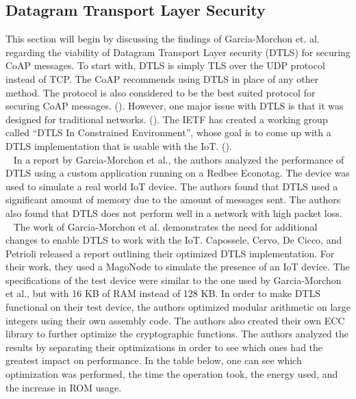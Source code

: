 \documentclass[letterpaper, 12pt]{article}
\begin{document}
\begin{flushleft}
\subsection*{Datagram Transport Layer Security}
This section will begin by discussing the findings of Garcia-Morchon et. al. regarding the viability of Datagram Transport Layer security (DTLS)
for securing CoAP messages. To start with, DTLS is simply TLS over the UDP protocol instead of TCP. The CoAP recommends using DTLS in place of any
other method. The protocol is also considered to be the best suited protocol for securing CoAP messages. (\cite{Keoh6817545}). However, one major issue with DTLS is that it was designed for traditional networks. (\cite{Capossele}). 
The IETF has created a working group called ``DTLS In Constrained Environment'', whose goal is to 
come up with a DTLS implementation that is usable with the IoT. (\cite{Keoh6817545}). \\
~\newline
In a report by Garcia-Morchon et al., the authors analyzed the performance of DTLS using a custom application running on a Redbee Econotag. The device
was used to simulate a real world IoT device. The authors found that DTLS used a significant amount of memory due to the amount of messages sent. 
The authors also found that DTLS does not perform well in a network with high packet loss. \\
~\newline
The work of Garcia-Morchon et al. demonstrates the need for additional changes to enable DTLS to work with the IoT. 
Capossele, Cervo, De Cicco,
and Petrioli released a report outlining their optimized DTLS implementation. For their work, they used a MagoNode to simulate the presence of an
IoT device. The specifications of the test device were similar to the one used by Garcia-Morchon et al., but with 16 KB of RAM instead of 128 KB.
In order to make DTLS functional on their test device, the authors optimized modular arithmetic on large integers using their own assembly code.
The authors also created their own ECC library to further optimize the cryptographic functions. The authors analyzed the results by separating their
optimizations in order to see which ones had the greatest impact on performance. In the table below, one can see which optimization was performed,
the time the operation took, the energy used, and the increase in ROM usage. 


\end{flushleft}
\end{document}
